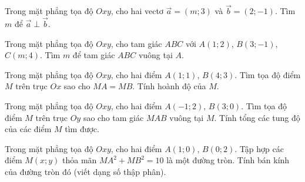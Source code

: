 \begin{bt}%
Trong mặt phẳng tọa độ $Oxy$, cho hai vectơ $\vec{a}=(m;3)$ và $\vec{b}=(2;-1)$. Tìm $m$ để $\vec{a}\perp\vec{b}$.
\end{bt}

\begin{bt}%
Trong mặt phẳng tọa độ $Oxy$, cho tam giác $ABC$ với $A(1;2)$, $B(3;-1)$, $C(m;4)$. Tìm $m$ để tam giác $ABC$ vuông tại $A$.
\end{bt}

\begin{bt}%
Trong mặt phẳng tọa độ $Oxy$, cho hai điểm $A(1;1)$, $B(4;3)$. Tìm tọa độ điểm $M$ trên trục $Ox$ sao cho $MA=MB$. Tính hoành độ của $M$.
\end{bt}

\begin{bt}%
Trong mặt phẳng tọa độ $Oxy$, cho hai điểm $A(-1;2)$, $B(3;0)$. Tìm tọa độ điểm $M$ trên trục $Oy$ sao cho tam giác $MAB$ vuông tại $M$. Tính tổng các tung độ của các điểm $M$ tìm được.
\end{bt}

\begin{bt}%
Trong mặt phẳng tọa độ $Oxy$, cho hai điểm $A(1;0)$, $B(0;2)$. Tập hợp các điểm $M(x;y)$ thỏa mãn $MA^2+MB^2=10$ là một đường tròn. Tính bán kính của đường tròn đó (viết dạng số thập phân).
\end{bt}

